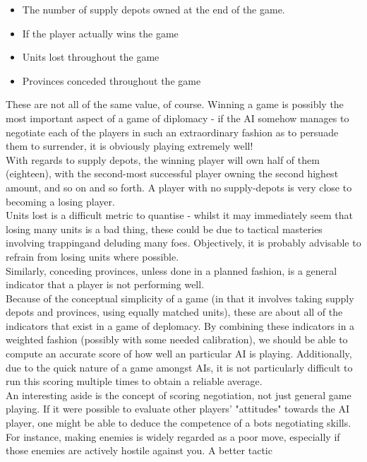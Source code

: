 \documentclass[11pt]{article}
\begin{document}
\begin{itemize}
\item The number of supply depots owned at the end of the game.
\item If the player actually wins the game
\item Units lost throughout the game
\item Provinces conceded throughout the game
\end{itemize}

These are not all of the same value, of course. Winning a game is possibly the
most important aspect of a game of diplomacy - if the AI somehow manages to 
negotiate each of the players in such an extraordinary fashion as to persuade
them to surrender, it is obviously playing extremely well! 
\\
With regards to supply depots, the winning player will own half of them 
(eighteen), with the second-most successful player owning the second highest 
amount, and so on and so forth. A player with no supply-depots is very close
to becoming a losing player.
\\
Units lost is a difficult metric to quantise - whilst it may immediately seem
that losing many units is a bad thing, these could be due to tactical masteries
involving trappingand deluding many foes. Objectively, it is probably advisable
to refrain from losing units where possible.
\\
Similarly, conceding provinces, unless done in a planned fashion, is a general
indicator that a player is not performing well.
\\
Because of the conceptual simplicity of a game (in that it involves taking 
supply depots and provinces, using equally matched units), these are about all 
of the indicators that exist in a game of deplomacy.  By combining these 
indicators in a weighted fashion (possibly with some needed calibration), we
should be able to compute an accurate score of how well an particular AI is 
playing. Additionally, due to the quick nature of a game amongst AIs, it is not
particularly difficult to run this scoring multiple times to obtain a reliable
average.
\\
An interesting aside is the concept of scoring negotiation, not just general 
game playing. If it were possible to evaluate other players' "attitudes" towards
the AI player, one might be able to deduce the competence of a bots negotiating
skills. For instance, making enemies is widely regarded as a poor move,
especially if those enemies are actively hostile against you. A better tactic 
\end{document}
